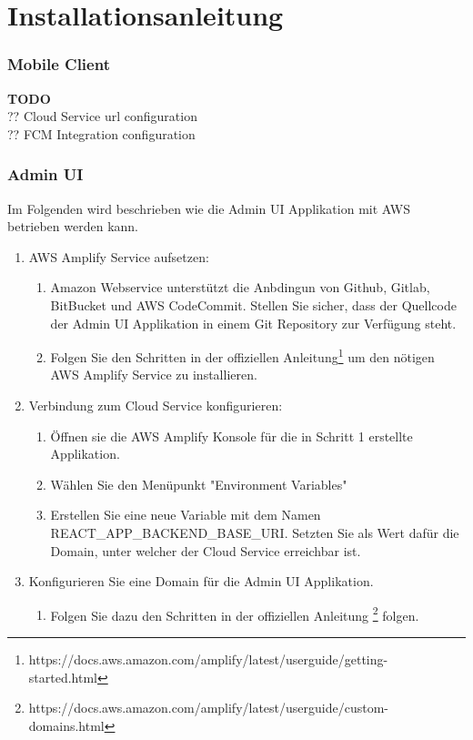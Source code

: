 
\section{Installationsanleitung}

\subsubsection*{Mobile Client}
\textbf{TODO} \\
?? Cloud Service url configuration \\
?? FCM Integration configuration \\

\subsubsection*{Admin UI}

Im Folgenden wird beschrieben wie die Admin UI Applikation mit AWS betrieben werden kann.

\begin{enumerate}
    \item AWS Amplify Service aufsetzen:
    \begin{enumerate}
        \item Amazon Webservice unterstützt die Anbdingun von Github, Gitlab, BitBucket und AWS CodeCommit. Stellen Sie sicher, dass der Quellcode der Admin UI Applikation in einem Git Repository zur Verfügung steht.
        \item Folgen Sie den Schritten in der offiziellen Anleitung\footnote{https://docs.aws.amazon.com/amplify/latest/userguide/getting-started.html} um den nötigen AWS Amplify Service zu installieren.
    \end{enumerate}
    \item Verbindung zum Cloud Service konfigurieren:
    \begin{enumerate}
        \item Öffnen sie die AWS Amplify Konsole für die in Schritt 1 erstellte Applikation.
        \item Wählen Sie den Menüpunkt "Environment Variables"
        \item Erstellen Sie eine neue Variable mit dem Namen REACT\_APP\_BACKEND\_BASE\_URI. Setzten Sie als Wert dafür die Domain, unter welcher der Cloud Service erreichbar ist.
    \end{enumerate}
    \item Konfigurieren Sie eine Domain für die Admin UI Applikation.
    \begin{enumerate}
        \item Folgen Sie dazu den Schritten in der offiziellen Anleitung \footnote{https://docs.aws.amazon.com/amplify/latest/userguide/custom-domains.html} folgen.
    \end{enumerate}
\end{enumerate}


